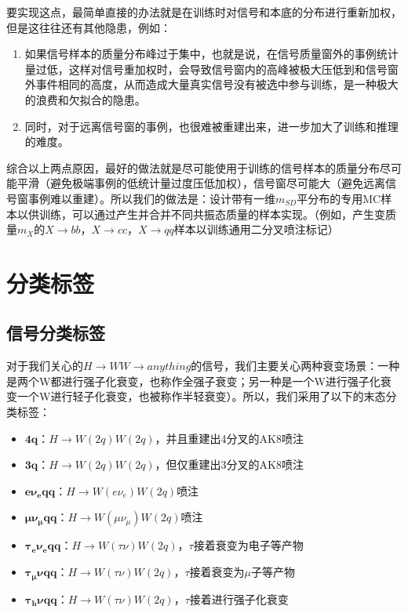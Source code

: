 要实现这点，最简单直接的办法就是在训练时对信号和本底的分布进行重新加权，但是这往往还有其他隐患，例如：
\begin{enumerate}[(1)]
    \item 如果信号样本的质量分布峰过于集中，也就是说，在信号质量窗外的事例统计量过低，这样对信号重加权时，会导致信号窗内的高峰被极大压低到和信号窗外事件相同的高度，从而造成大量真实信号没有被选中参与训练，是一种极大的浪费和欠拟合的隐患。
    \item 同时，对于远离信号窗的事例，也很难被重建出来，进一步加大了训练和推理的难度。
\end{enumerate}

综合以上两点原因，最好的做法就是尽可能使用于训练的信号样本的质量分布尽可能平滑（避免极端事例的低统计量过度压低加权），信号窗尽可能大（避免远离信号窗事例难以重建）。所以我们的做法是：设计带有一维$ m_{SD}$平分布的专用MC样本以供训练，可以通过产生并合并不同共振态质量的样本实现。（例如，产生变质量$m_X$的$X\to bb$，$X\to cc$，$X\to qq$样本以训练通用二分叉喷注标记）

\section{分类标签}
\subsection{信号分类标签}
对于我们关心的$H\to WW\to anything$的信号，我们主要关心两种衰变场景：一种是两个W都进行强子化衰变，也称作全强子衰变；另一种是一个W进行强子化衰变一个W进行轻子化衰变，也被称作半轻衰变）。所以，我们采用了以下的末态分类标签：
\begin{itemize}
    \item $\mathbf{4q}$：$H\to W(2q)W(2q)$，并且重建出4分叉的AK8喷注
    \item $\mathbf{3q}$：$H\to W(2q)W(2q)$，但仅重建出3分叉的AK8喷注
    \item $\mathbf{e\nu_e qq}$：$H\to W(e\nu_e)W(2q)$喷注
    \item $\mathbf{\mu\nu_\mu qq}$：$H\to W(\mu\nu_\mu)W(2q)$喷注
    \item $\mathbf{\tau_e\nu_eqq}$：$H\to W(\tau\nu)W(2q)$，$\tau$接着衰变为电子等产物
    \item $\bm{\tau_\mu\nu qq}$：$H\to W(\tau\nu)W(2q)$，$\tau$接着衰变为$\mu$子等产物
    \item $\mathbf{\tau_h\nu qq}$：$H\to W(\tau\nu)W(2q)$，$\tau$接着进行强子化衰变
\end{itemize}
